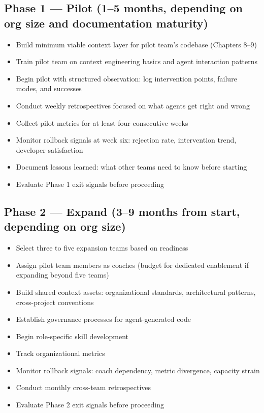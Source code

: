 \documentclass[
  a4paper,
  DIV=11,
  numbers=noendperiod]{scrreprt}
\providecommand{\tightlist}{%
  \setlength{\itemsep}{0pt}\setlength{\parskip}{0pt}}
\begin{document}
\subsection{Phase 1 --- Pilot (1--5 months, depending on org size and
documentation
maturity)}\label{phase-1-pilot-15-months-depending-on-org-size-and-documentation-maturity}

\begin{itemize}
\tightlist
\item[$\square$]
  Build minimum viable context layer for pilot team's codebase (Chapters
  8--9)
\item[$\square$]
  Train pilot team on context engineering basics and agent interaction
  patterns
\item[$\square$]
  Begin pilot with structured observation: log intervention points,
  failure modes, and successes
\item[$\square$]
  Conduct weekly retrospectives focused on what agents get right and
  wrong
\item[$\square$]
  Collect pilot metrics for at least four consecutive weeks
\item[$\square$]
  Monitor rollback signals at week six: rejection rate, intervention
  trend, developer satisfaction
\item[$\square$]
  Document lessons learned: what other teams need to know before
  starting
\item[$\square$]
  Evaluate Phase 1 exit signals before proceeding
\end{itemize}

\subsection{Phase 2 --- Expand (3--9 months from start, depending on org
size)}\label{phase-2-expand-39-months-from-start-depending-on-org-size}

\begin{itemize}
\tightlist
\item[$\square$]
  Select three to five expansion teams based on readiness
\item[$\square$]
  Assign pilot team members as coaches (budget for dedicated enablement
  if expanding beyond five teams)
\item[$\square$]
  Build shared context assets: organizational standards, architectural
  patterns, cross-project conventions
\item[$\square$]
  Establish governance processes for agent-generated code
\item[$\square$]
  Begin role-specific skill development
\item[$\square$]
  Track organizational metrics
\item[$\square$]
  Monitor rollback signals: coach dependency, metric divergence,
  capacity strain
\item[$\square$]
  Conduct monthly cross-team retrospectives
\item[$\square$]
  Evaluate Phase 2 exit signals before proceeding
\end{itemize}
\end{document}
